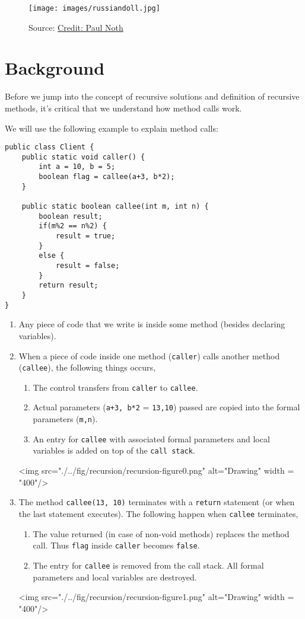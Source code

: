 \def\topic{Recursion}


\begin{figure}
\centering	
\texttt{[image: images/russiandoll.jpg]}
\caption{Source: \href{https://condenaststore.com/featured/a-doctor-is-seen-giving-an-sonogram-to-a-russian-paul-noth.html}{Credit: Paul Noth}}
\end{figure}

\section{Background}

Before we jump into the concept of recursive solutions and definition of recursive methods, it's critical that we understand how method calls work.

We will use the following example to explain method calls:

\begin{lstlisting}
public class Client {
	public static void caller() {
		int a = 10, b = 5;
		boolean flag = callee(a+3, b*2);
	}
	
	public static boolean callee(int m, int n) {
		boolean result;
		if(m%2 == n%2) {
			result = true;
		}
		else {
			result = false;
		}
		return result;
	}
}
\end{lstlisting}

\begin{enumerate}
  \item Any piece of code that we write is inside some method (besides declaring variables).
  \item When a piece of code inside one method (\texttt{caller}) calls another method (\texttt{callee}), the following things occurs,
  \begin{enumerate}
  \item The control transfers from \texttt{caller} to \texttt{callee}. 
  \item Actual parameters (\texttt{a+3, b*2} = \texttt{13,10}) passed are copied into the formal parameters (\texttt{m,n}). 
  \item An entry for \texttt{callee} with associated formal parameters and local variables is added on top of the \texttt{call stack}.
  \end{enumerate}
  <img src="./../fig/recursion/recursion-figure0.png" alt="Drawing" width = "400"/>

  \item The method \texttt{callee(13, 10)} terminates with a \texttt{return} statement (or when the last statement  executes). The following happen when \texttt{callee} terminates,
  \begin{enumerate}
  \item The value returned (in case of non-void methods) replaces the method call. Thus \texttt{flag} inside \texttt{caller} becomes \texttt{false}.
  \item The entry for \texttt{callee} is removed from the call stack. All formal parameters and local variables are destroyed.
  \end{enumerate}
  <img src="./../fig/recursion/recursion-figure1.png" alt="Drawing" width = "400"/>
\end{enumerate}

